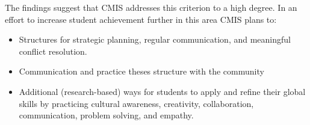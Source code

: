 
The findings suggest that CMIS addresses this criterion to a high degree. In an effort to increase student achievement further in this area CMIS plans to:

\begin{itemize}
\item Structures for strategic planning, regular communication, and meaningful conflict resolution. 
\item Communication and practice theses structure with the community
\end{itemize}


\begin{itemize}
\item Additional (research-based) ways for students to apply and refine their global skills by practicing cultural awareness, creativity, collaboration, communication, problem solving, and empathy.
\end{itemize}

